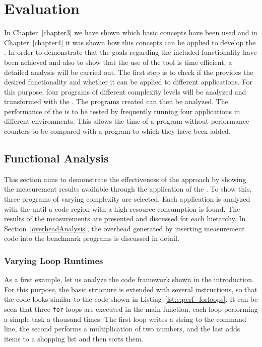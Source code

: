 \chapter{Evaluation}
\label{chapter5}
In Chapter~\ref{chapter3} we have shown which basic concepts have been used and in Chapter~\ref{chapter4} it was shown how this concepts can be applied to develop the \TOOL. In order to demonstrate that the goals regarding the included functionality have been achieved and also to show that the use of the tool is time efficient, a detailed analysis will be carried out. The first step is to check if the \TOOL provides the desired functionality and whether it can be applied to different applications. For this purpose, four programs of different complexity levels will be analyzed and transformed with the \TOOL. The programs created can then be analyzed. The performance of the \TOOL is to be tested by frequently running four applications in different environments. This allows the time of a program without performance counters to be compared with a program to which they have been added.

\section{Functional Analysis}
This section aims to demonstrate the effectiveness of the approach by showing the measurement results available through the application of the \TOOL. To show this, three programs of varying complexity are selected. Each application is analyzed with the \TOOL until a code region with a high resource consumption is found. The results of the measurements are presented and discussed for each hierarchy. In Section~\ref{overheadAnalysis}, the overhead generated by inserting measurement code into the benchmark programs is discussed in detail. 

\subsection{Varying Loop Runtimes}
As a first example, let us analyze the code framework shown in the introduction. For this purpose, the basic structure is extended with several instructions, so that the code looks similar to the code shown in Listing~\ref{lst:e:perf_forloops}. It can be seen that three \lstinline{for}-loops are executed in the main function, each loop performing a simple task a thousand times. The first loop writes a string to the command line, the second performs a multiplication of two numbers, and the last adds items to a shopping list and then sorts them. 


